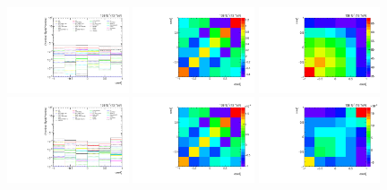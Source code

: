 \clearpage
\begin{figure}[htb]
\begin{center}
 \includegraphics[width=0.32\textwidth]{fig_fullRun2UL/unfolding/combined/deltaSystCombinedlog_rebinnedB_b2k.pdf}
 \includegraphics[width=0.32\textwidth]{fig_fullRun2UL/unfolding/combined/StatCovMatrix_rebinnedB_b2k.pdf}
 \includegraphics[width=0.32\textwidth]{fig_fullRun2UL/unfolding/combined/TotalSystCovMatrix_rebinnedB_b2k.pdf} \\
 \includegraphics[width=0.32\textwidth]{fig_fullRun2UL/unfolding/combined/deltaSystCombinedlogNorm_rebinnedB_b2k.pdf}
 \includegraphics[width=0.32\textwidth]{fig_fullRun2UL/unfolding/combined/StatCovMatrixNorm_rebinnedB_b2k.pdf}
 \includegraphics[width=0.32\textwidth]{fig_fullRun2UL/unfolding/combined/TotalSystCovMatrixNorm_rebinnedB_b2k.pdf} \\

\end{center}
\end{figure}
